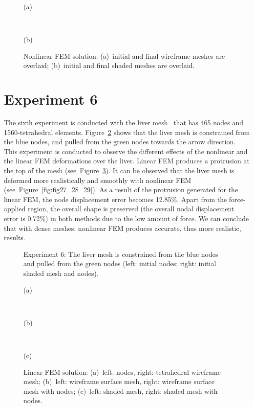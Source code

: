 \begin{figure}[h]
\centerline{}
\centerline{(a)}
\centerline{\ }
\centerline{}
\centerline{(b)}
\caption{Nonlinear FEM solution: (a)~initial and final wireframe meshes are overlaid; (b)~initial and final shaded meshes are overlaid.}
\label{fig:fig21_22}
\end{figure}

\clearpage
\section{Experiment 6}
\label{vi}

The sixth experiment is conducted with the liver mesh~\cite{Liver2011} that has 465 nodes and 1560-tetrahedral elements. Figure~\ref{fig:fig23} shows that the liver mesh is constrained from the blue nodes, and pulled from the green nodes towards the arrow direction. This experiment is conducted to observe the different effects of the nonlinear and the linear FEM deformations over the liver. Linear FEM produces a protrusion at the top of the mesh (see~Figure~\ref{fig:fig24_25_26}). It can be observed that the liver mesh is deformed more realistically and smoothly with nonlinear FEM (see~Figure~\ref{fig:fig27_28_29}). As a result of the protrusion generated for the linear FEM, the node displacement error becomes 12.85\%. Apart from the force-applied region, the overall shape is preserved (the overall nodal displacement error is 0.72\%) in both methods due to the low amount of force. We can conclude that with dense meshes, nonlinear FEM produces accurate, thus more realistic, results.


\begin{figure}[h]
\centerline{}
\caption{Experiment 6: The liver mesh is constrained from the blue nodes and pulled from the green nodes (left: initial nodes; right: initial shaded mesh and nodes).}
\label{fig:fig23}
\end{figure}

\begin{figure}[h]
\centerline{}
\centerline{(a)}
\centerline{\ }
\centerline{}
\centerline{(b)}
\centerline{\ }
\centerline{}
\centerline{(c)}
\caption{Linear FEM solution: (a)~left: nodes, right: tetrahedral wireframe mesh;
                              (b)~left: wireframe surface mesh, right: wireframe surface mesh with nodes;
                              (c)~left: shaded mesh, right: shaded mesh with nodes.}
\label{fig:fig24_25_26}
\end{figure}

